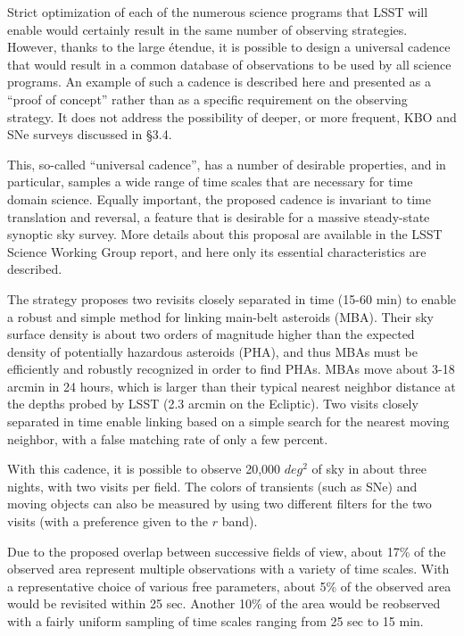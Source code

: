 Strict optimization of each of the numerous science programs that LSST will
enable would certainly result in the same number of observing strategies.
However, thanks to the large \'{e}tendue, it is possible to design a universal
cadence that would result in a common database of observations to be used by
all science programs. An example of such a cadence is described here and
presented as a ``proof of concept'' rather than as a specific requirement
on the observing strategy. It does not address the possibility of deeper,
or more frequent, KBO and SNe surveys discussed in \S 3.4.

This, so-called ``universal cadence'', has a number of desirable properties,
and in particular, samples a wide range of time scales that are necessary for
time domain science. Equally important, the proposed cadence is invariant to
time translation and reversal, a feature that is desirable for a massive
steady-state synoptic sky survey. More details about this proposal are available
in the LSST Science Working Group report, and here only its essential
characteristics are described.

The strategy proposes two revisits closely separated in time (15-60 min)
to enable a robust and simple method for linking main-belt asteroids (MBA).
Their sky surface density is about two orders of magnitude higher than the
expected density of potentially hazardous asteroids (PHA), and thus MBAs
must be efficiently and robustly recognized in order to find PHAs. MBAs
move about 3-18 arcmin in 24 hours, which is larger than their typical
nearest neighbor distance at the depths probed by LSST (2.3 arcmin on the
Ecliptic). Two visits closely separated in time enable linking based on
a simple search for the nearest moving neighbor, with a false matching
rate of only a few percent.

With this cadence, it is possible to observe 20,000 $deg^2$ of sky
in about three nights, with two visits per field. The colors of
transients (such as SNe) and moving objects can also be measured by
using two different filters for the two visits (with a preference given
to the $r$ band).

Due to the proposed overlap between successive fields of view, about
17\% of the observed area represent multiple observations with a variety
of time scales. With a representative choice of various free parameters,
about 5\% of the observed area would be revisited within 25 sec.
Another 10\% of the area would be reobserved with a fairly uniform
sampling of time scales ranging from 25 sec to 15 min.

